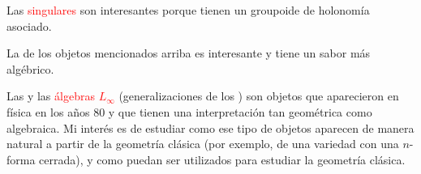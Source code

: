 \documentclass[11pt, letterpaper, oneside]{amsart}
\theoremstyle{plain}
\theoremstyle{definition}
\theoremstyle{remark}
\begin{document}
Las  \textcolor{red}{singulares}  son interesantes porque tienen un groupoide de holonom\'ia asociado.

La  de los objetos mencionados arriba es interesante y tiene un sabor m\'as alg\'ebrico.

Las  y las  \textcolor{red}{\'algebras $L_{\infty}$} (generalizaciones de los ) son objetos que aparecieron en f\'isica en los a\~nos 80 y que tienen una interpretaci\'on  tan geom\'etrica como algebraica. Mi inter\'es es de estudiar como ese tipo de objetos aparecen de manera natural a partir de la geometr\'ia cl\'asica (por exemplo, de una variedad con una $n$-forma cerrada), y como puedan ser utilizados para estudiar la geometr\'ia cl\'asica.





 
 
 
 

%
%
\end{document}
